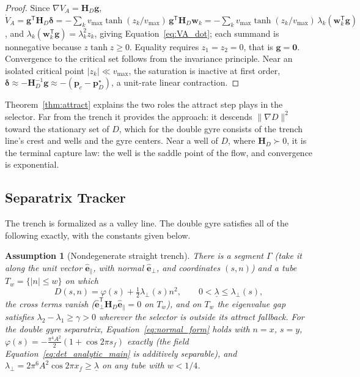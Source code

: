 \documentclass[12pt, letterpaper, oneside]{report}
\newtheorem{assumption}[theorem]{Assumption}
\begin{document}
\begin{proof}
Since $\nabla V_A=\mathbf{H}_D\mathbf{g}$,
$\dot V_A = \mathbf{g}^{\mathsf T}\mathbf{H}_D\boldsymbol{\delta}
= -\sum_k v_{\max}\tanh(z_k/v_{\max})\,\mathbf{g}^{\mathsf T}\mathbf{H}_D\mathbf{w}_k
= -\sum_k v_{\max}\tanh(z_k/v_{\max})\,\lambda_k(\mathbf{w}_k^{\mathsf T}\mathbf{g})$,
and $\lambda_k(\mathbf{w}_k^{\mathsf T}\mathbf{g})=\lambda_k^2z_k$, giving
Equation~\eqref{eq:VA_dot}; each summand is nonnegative because
$z\tanh z\geq0$. Equality requires $z_1=z_2=0$, that is
$\mathbf{g}=\mathbf{0}$. Convergence to the critical set follows from the
invariance principle. Near an isolated critical point $|z_k|\ll v_{\max}$,
the saturation is inactive at first order,
$\boldsymbol{\delta}\approx-\mathbf{H}_D^{-1}\mathbf{g}\approx-(\mathbf{p}_c-\mathbf{p}^\star_D)$,
a unit-rate linear contraction.
\end{proof}

Theorem~\ref{thm:attract} explains the two roles the attract step plays in
the selector. Far from the trench it provides the approach: it descends
$\lVert\nabla D\rVert^2$ toward the stationary set of $D$, which for the
double gyre consists of the trench line's crest and wells and the gyre
centers. Near a well of $D$, where $\mathbf{H}_D\succ0$, it is the
terminal capture law: the well is the saddle point of the flow, and
convergence is exponential.

\subsection{Separatrix Tracker}
\label{sec:stab_sep}

The trench is formalized as a valley line. The double gyre satisfies all
of the following exactly, with the constants given below.

\begin{assumption}[Nondegenerate straight trench]
\label{ass:trench}
There is a segment $\Gamma$ (take it along the unit vector
$\hat{\mathbf{e}}_\parallel$, with normal $\hat{\mathbf{e}}_\perp$, and
coordinates $(s,n)$) and a tube $T_w=\{|n|\leq w\}$ on which
\begin{equation}
D(s,n) = \varphi(s) + \tfrac12\lambda_\perp(s)n^2, \qquad 0 < \underline{\lambda} \leq \lambda_\perp(s),
\label{eq:normal_form}
\end{equation}
the cross terms vanish
($\hat{\mathbf{e}}_\perp^{\mathsf T}\mathbf{H}_D\hat{\mathbf{e}}_\parallel=0$
on $T_w$), and on $T_w$ the eigenvalue gap satisfies
$\lambda_2-\lambda_1\geq\gamma>0$ wherever the selector is outside its
attract fallback. For the double gyre separatrix,
Equation~\eqref{eq:normal_form} holds with $n=x$, $s=y$,
$\varphi(s)=-\tfrac{\pi^4A^2}{2}(1+\cos2\pi s_f)$ exactly (the field
Equation~\eqref{eq:det_analytic_main} is additively separable), and
$\lambda_\perp=2\pi^6A^2\cos2\pi x_f\geq\underline\lambda$ on any tube with
$w<1/4$.
\end{assumption}
\end{document}

